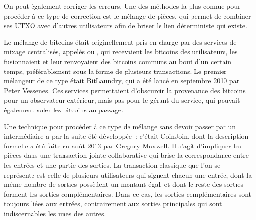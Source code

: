 On peut également corriger les erreurs. Une des méthodes la plus connue pour procéder à ce type de correction est le mélange de pièces, qui permet de combiner ses UTXO avec d'autres utilisateurs afin de briser le lien déterministe qui existe.

Le mélange de bitcoins était originellement pris en charge par des services de mixage centralisés, appelés  ou , qui recevaient les bitcoins des utilisateurs, les fusionnaient et leur renvoyaient des bitcoins communs au bout d'un certain temps, préférablement sous la forme de plusieurs transactions. Le premier mélangeur de ce type était BitLaundry, qui a été lancé en septembre 2010 par Peter Vessenes. Ces services permettaient d'obscurcir la provenance des bitcoins pour un observateur extérieur, mais pas pour le gérant du service, qui pouvait également voler les bitcoins au passage.  %

Une technique pour procéder à ce type de mélange sans devoir passer par un intermédiaire a par la suite été développée~: c'était CoinJoin, dont la description formelle a été faite en août 2013 par Gregory Maxwell. Il s'agit d'impliquer les pièces dans une transaction jointe collaborative qui brise la correspondance entre les entrées et une partie des sorties. La transaction classique que l'on se représente est celle de plusieurs utilisateurs qui signent chacun une entrée, dont la même nombre de sorties possèdent un montant égal, et dont le reste des sorties forment les sorties complémentaires. Dans ce cas, les sorties complémentaires sont toujours liées aux entrées, contrairement aux sorties principales qui sont indiscernables les unes des autres.

